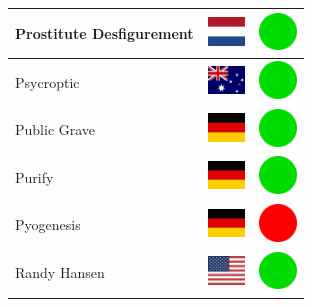 \documentclass[12pt, a4paper, twoside]{report}
\begin{document}
\begin{center}
\begin{longtable}{|p{5cm}|p{2cm}|p{2cm}|}
			Prostitute Desfigurement & \includegraphics[width=1cm]{4x3/nl} & \includegraphics[width=1cm]{likes/y} \\ \hline
			Psycroptic & \includegraphics[width=1cm]{4x3/au} & \includegraphics[width=1cm]{likes/y} \\ \hline
			Public Grave & \includegraphics[width=1cm]{4x3/de} & \includegraphics[width=1cm]{likes/y} \\ \hline
			Purify & \includegraphics[width=1cm]{4x3/de} & \includegraphics[width=1cm]{likes/y} \\ \hline
			Pyogenesis & \includegraphics[width=1cm]{4x3/de} & \includegraphics[width=1cm]{likes/n} \\ \hline
			Randy Hansen & \includegraphics[width=1cm]{4x3/us} & \includegraphics[width=1cm]{likes/y} \\ \hline

\end{longtable}
\end{center}
\end{document}
